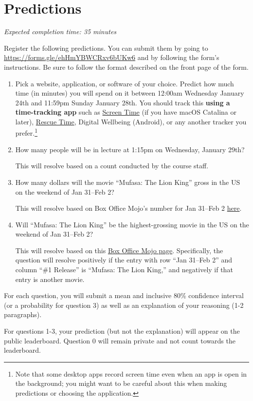 \documentclass[11pt]{article}
\begin{document}
\section*{Predictions}

\emph{Expected completion time: 35 minutes}


Register the following predictions. You can submit them by going to 
\url{https://forms.gle/ehHmYBWCRxv6bUKw6} and by following the form's instructions. Be sure to follow the format described on the front page of the form.

\begin{enumerate}
\item[0.] Pick a website, application, or software of your choice. Predict how much time (in minutes) you will spend on it between 12:00am Wednesday January 24th and 11:59pm Sunday January 28th. You should track this {\bf using a time-tracking app} such as \href{https://support.apple.com/en-us/HT210387}{Screen Time} (if you have macOS Catalina or later), \href{https://www.rescuetime.com/}{Rescue Time}, Digital Wellbeing (Android), or any another tracker you prefer.\footnote{Note that some desktop apps record screen time even when an app is open in the background; you might want to be careful about this when making predictions or choosing the application.}

\item[1.] How many people will be in lecture at 1:15pm on Wednesday, January 29th?

      This will resolve based on a count conducted by the course staff.

\item[2.] How many dollars will the movie ``Mufasa: The Lion King'' gross in the US on the weekend of Jan 31--Feb 2?

      This will resolve based on Box Office Mojo's number for Jan 31--Feb 2 \href{https://www.boxofficemojo.com/release/rl615482113/weekend/?ref_=bo_rl_tab#tabs}{here}. 

\item[3.] Will ``Mufasa: The Lion King'' be the highest-grossing movie in the US on the weekend of Jan 31--Feb 2? 

      This will resolve based on this \href{https://www.boxofficemojo.com/weekend/?ref_=bo_nb_wey_secondarytab}{Box Office Mojo page}. Specifically, the question will resolve positively if the entry with row ``Jan 31--Feb 2'' and column ``\#1 Release'' is ``Mufasa: The Lion King,'' and negatively if that entry is another movie.

\end{enumerate}
 
For each question, you will submit a mean and inclusive 80\% confidence interval (or a probability for question 3) 
as well as an explanation of your reasoning (1-2 paragraphs).

For questions 1-3, your prediction (but not the explanation) will appear on the public leaderboard. 
Question 0 will remain private and not count towards the leaderboard.
\end{document}
